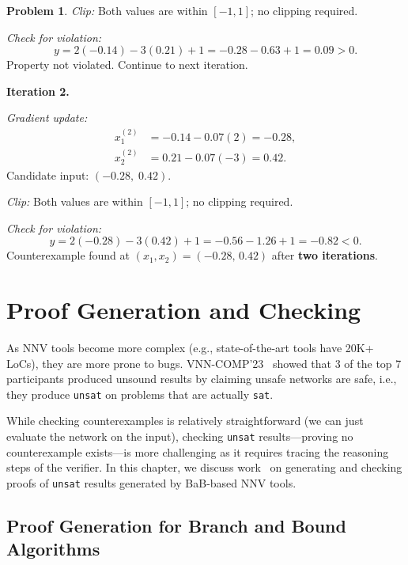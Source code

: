 \documentclass[oneside,11pt,dvipsnames]{book}
\numberwithin{equation}{section}
\theoremstyle{definition}
\newtheorem{problem}{Problem}[section]
\theoremstyle{remark}
\newenvironment{solution}{%
  \ifbool{showsol}{%
    \begin{mysolbox}%
        {\small \textbf{Solution}: }
  }{%
    \comment %
  }%
}{%
  \ifbool{showsol}{%
    \end{mysolbox}%
  }{%
    \endcomment %
  }%
}
\newcommand{\sat}{\texttt{sat}}
\newcommand{\unsat}{\texttt{unsat}}
\begin{document}
\begin{problem}
\begin{solution}
\textit{Clip:} Both values are within $[-1,1]$; no clipping required.

\textit{Check for violation:}
\[
y = 2(-0.14) - 3(0.21) + 1 = -0.28 - 0.63 + 1 = 0.09 > 0.
\]
Property not violated. Continue to next iteration.

\par\medskip
\noindent\textbf{Iteration 2.}\par

\textit{Gradient update:}
\begin{align*}
x_1^{(2)} &= -0.14 - 0.07(2) = -0.28, \\
x_2^{(2)} &= 0.21 - 0.07(-3) = 0.42.
\end{align*}
Candidate input: $(-0.28,\; 0.42)$.

\textit{Clip:} Both values are within $[-1,1]$; no clipping required.

\textit{Check for violation:}
\[
y = 2(-0.28) - 3(0.42) + 1 = -0.56 - 1.26 + 1 = -0.82 < 0.
\]
Counterexample found at $(x_1, x_2) = (-0.28,\, 0.42)$ after \textbf{two iterations}.
\end{solution}
\end{problem}

\chapter{Proof Generation and Checking}\label{chap:proof-gen-check}

As NNV tools become more complex (e.g., state-of-the-art tools have 20K+ LoCs), they are more prone to bugs. VNN-COMP'23~\cite{brix2023fourth} showed that 3 of the top 7 participants produced unsound results by claiming unsafe networks are safe, i.e., they produce \unsat{} on problems that are actually \sat{}.

While checking counterexamples is relatively straightforward (we can just evaluate the network on the input), checking \unsat{} results---proving no counterexample exists---is more challenging as it requires tracing the reasoning steps of the verifier.
In this chapter, we discuss work~\cite{duong2025generating} on generating and checking proofs of \unsat{} results generated by BaB-based NNV tools.

\section{Proof Generation for Branch and Bound Algorithms}\label{sec:proofgen}
\end{document}
